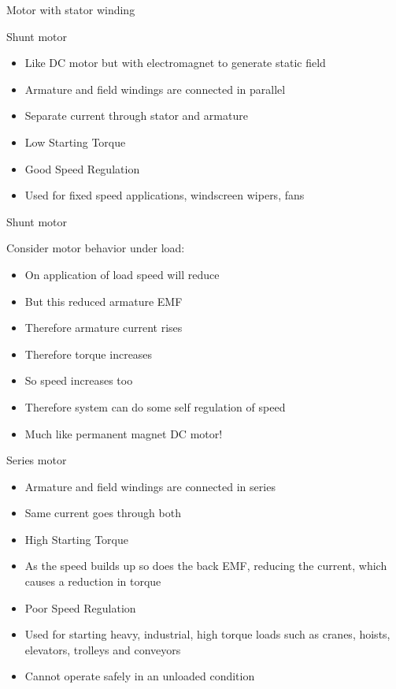 \documentclass[compress]{beamer}
\begin{document}
\begin{frame}{Motor with stator winding}

\end{frame}

\begin{frame}{Shunt motor}

\begin{itemize}
\item Like DC motor but with electromagnet to generate static field
\item Armature and field windings are connected in parallel
\item Separate current through stator and armature
\item Low Starting Torque
\item Good Speed Regulation
\item Used for fixed speed applications, windscreen wipers, fans
\end{itemize}

\end{frame}

\begin{frame}{Shunt motor}

Consider motor behavior under load:

\begin{itemize}

\item On application of load speed will reduce
\item But this reduced armature EMF
\item Therefore armature current rises
\item Therefore torque increases
\item So speed increases too
\item Therefore system can do some self regulation of speed
\item Much like permanent magnet DC motor!
\end{itemize}

\end{frame}

\begin{frame}{Series motor}

\begin{itemize}

\item Armature and field windings are connected in series
\item Same current goes through both
\item High Starting Torque
\item As the speed builds up so does the back EMF, reducing the current,
  which causes a reduction in torque
\item Poor Speed Regulation
\item Used for starting heavy, industrial, high torque loads such as cranes,
  hoists, elevators, trolleys and conveyors
\item Cannot operate safely in an unloaded condition
\end{itemize}

\end{frame}
\end{document}
